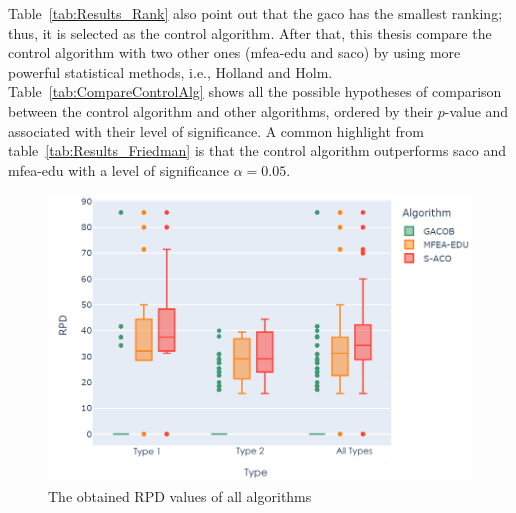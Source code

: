 \bigskip
\begin{table}[!htp]
	\centering
	\caption{The z-values and p-values of the Friedman procedures ( is the control algorithm)} 
	\label{tab:CompareControlAlg}
\end{table}
\bigskip

Table~\ref{tab:Results_Rank} also point out that the \acrshort{gaco} has the smallest ranking; thus, it is selected as the control algorithm. After that, this thesis compare the control algorithm with two other ones (\acrshort{mfea-edu} and \acrshort{saco}) by using more powerful statistical methods, i.e., Holland and Holm. Table~\ref{tab:CompareControlAlg} shows all the possible hypotheses of comparison between the control algorithm and other algorithms, ordered by their $p$-value and associated with their level of significance. A common highlight from table~\ref{tab:Results_Friedman} is that the control algorithm outperforms \acrshort{saco} and \acrshort{mfea-edu} with a level of significance $\alpha = 0.05$.
\bigskip
\renewcommand{\scalefigure}{0.5}
\begin{figure}[htbp]
	\centering
	\includegraphics[scale=\scalefigure]{Figures/chap 4/RPD_each_set.png}
	\caption{The obtained RPD values of all algorithms}
	\label{fig:rpd}
\end{figure}
\bigskip
